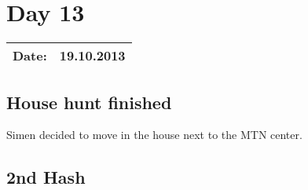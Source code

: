 \section{Day 13}
\begin{tabular}{|c|c|}
\hline
Date: & 19.10.2013 \\
\hline
\end{tabular}
\subsection{House hunt finished}
Simen decided to move in the house next to the MTN center.
\subsection{2nd Hash}

